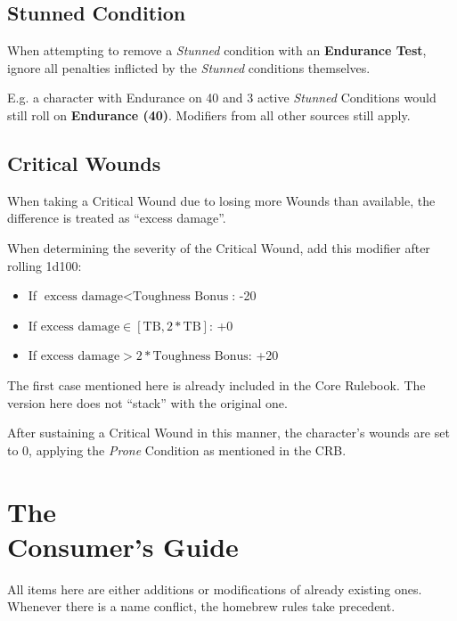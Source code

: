 \documentclass[parskip=full,11pt]{wfrp-short}
\begin{document}
\subsection{Stunned Condition}
When attempting to remove a \textit{Stunned} condition with an
\textbf{Endurance Test}, ignore all penalties inflicted by the \textit{Stunned}
conditions themselves.

E.g. a character with Endurance on 40 and 3 active \textit{Stunned} Conditions
would still roll on \textbf{Endurance (40)}.
Modifiers from all other sources still apply.

\subsection{Critical Wounds}
When taking a Critical Wound due to losing more Wounds than available, the
difference is treated as \enquote{excess damage}.

When determining the severity of the Critical Wound, add this modifier after
rolling 1d100:
\begin{itemize}
    \item If $\text{excess damage} < \text{Toughness Bonus}$: -20
    \item If $\text{excess damage} \in [\text{TB}, 2*\text{TB}]$: +0
    \item If $\text{excess damage} > 2* \text{Toughness Bonus}$: +20
\end{itemize}

The first case mentioned here is already included in the Core Rulebook.
The version here does not \enquote{stack} with the original one.

After sustaining a Critical Wound in this manner, the character's wounds are
set to 0, applying the \textit{Prone} Condition as mentioned in the CRB.

\section[The Consumer's Guide]{The\\Consumer's Guide}

All items here are either additions or modifications of already existing ones.
Whenever there is a name conflict, the homebrew rules take precedent.
\end{document}
